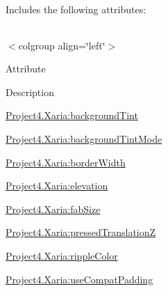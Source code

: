 Includes the following attributes\+:

\tabulinesep=1mm
\begin{longtabu} spread 0pt [c]{*{0}{|X[-1]}|}
\hline
\end{longtabu}
$<$colgroup align=\char`\"{}left\char`\"{}$>$ 

Attribute

Description 

{\ttfamily \hyperlink{classproject4_1_1xaria_1_1R_1_1styleable_ab51ba534c762989e0a01ee546e7b38ce}{Project4.\+Xaria\+:background\+Tint}}

{\ttfamily \hyperlink{classproject4_1_1xaria_1_1R_1_1styleable_ad842e522e53bfbbcc8e47812cbc7d296}{Project4.\+Xaria\+:background\+Tint\+Mode}}

{\ttfamily \hyperlink{classproject4_1_1xaria_1_1R_1_1styleable_a670df91ac65db7bb060f28a69c8c2ce1}{Project4.\+Xaria\+:border\+Width}}

{\ttfamily \hyperlink{classproject4_1_1xaria_1_1R_1_1styleable_a1f212346344f0518ba9f7671202beaf7}{Project4.\+Xaria\+:elevation}}

{\ttfamily \hyperlink{classproject4_1_1xaria_1_1R_1_1styleable_a7a8737e325d68750ce13b2e494dd1c65}{Project4.\+Xaria\+:fab\+Size}}

{\ttfamily \hyperlink{classproject4_1_1xaria_1_1R_1_1styleable_a0017ae9170f65572e5d8c6c4077e3a32}{Project4.\+Xaria\+:pressed\+TranslationZ}}

{\ttfamily \hyperlink{classproject4_1_1xaria_1_1R_1_1styleable_a74c9af162dc277de265d5a2e6fbcbe9e}{Project4.\+Xaria\+:ripple\+Color}}

{\ttfamily \hyperlink{classproject4_1_1xaria_1_1R_1_1styleable_a234a6a0e94e66106e7873eb4647e1fcb}{Project4.\+Xaria\+:use\+Compat\+Padding}}

